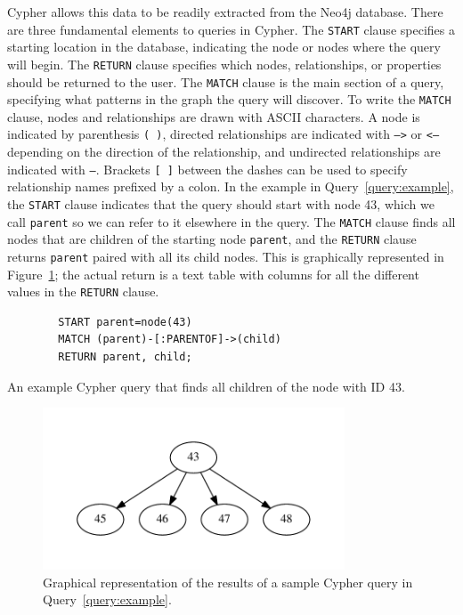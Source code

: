 Cypher allows this data to be readily extracted from the Neo4j database. There are three 
fundamental elements to queries in Cypher. The \texttt{START} clause specifies a starting location 
in the database, indicating the node or nodes where the query will begin. The \texttt{RETURN} 
clause specifies which nodes, relationships, or properties should be returned to the user. 
The \texttt{MATCH} clause is the main section of a query, specifying what patterns in the 
graph the query will discover. To write the \texttt{MATCH} clause, nodes and relationships 
are drawn with ASCII characters. A node is indicated by parenthesis \texttt{( )}, directed 
relationships are indicated with \texttt{-->} or \texttt{<--} depending on the direction of 
the relationship, and undirected relationships are indicated with \texttt{--}. 
Brackets \texttt{[ ]} between the dashes can be used to specify relationship names prefixed 
by a colon. In the example in Query~\ref{query:example}, the \texttt{START} clause indicates 
that the query should start with node 43, which we call \texttt{parent} so we can refer to it
elsewhere in the query. The \texttt{MATCH} clause finds all nodes that are children of the 
starting node \texttt{parent}, and the \texttt{RETURN} clause returns \texttt{parent} paired with
all its child nodes. This is graphically represented in Figure~\ref{fig:exampleQuery}; the actual
return is a text table with columns for all the different values in the \texttt{RETURN} clause.

\begin{Query}[t]
	\smallskip
	\begin{verbatim}
	    START parent=node(43)
	    MATCH (parent)-[:PARENTOF]->(child)
	    RETURN parent, child;
	\end{verbatim}
	\caption{An example Cypher query that finds all children of the node with ID 43.}
	\label{query:example}
\end{Query}

\begin{figure}[tb]
 \sidecaption[t]
 \includegraphics[width=0.8\textwidth]{figures/sample_neo4j_query.pdf}
 \caption{Graphical representation of the results of a sample Cypher query in Query~\ref{query:example}.}
 \label{fig:exampleQuery}
\end{figure}


